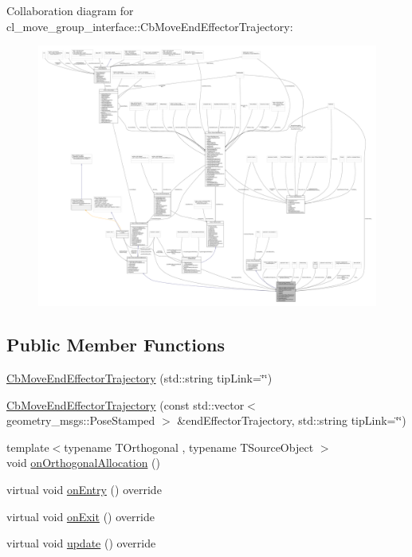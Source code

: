 Collaboration diagram for cl\+\_\+move\+\_\+group\+\_\+interface\+:\+:Cb\+Move\+End\+Effector\+Trajectory\+:
\nopagebreak
\begin{figure}[H]
\begin{center}
\leavevmode
\includegraphics[width=350pt]{classcl__move__group__interface_1_1CbMoveEndEffectorTrajectory__coll__graph}
\end{center}
\end{figure}
\subsection*{Public Member Functions}
\begin{DoxyCompactItemize}
\item 
\hyperlink{classcl__move__group__interface_1_1CbMoveEndEffectorTrajectory_af7e718b0c53e912fd74968abbb0a4810}{Cb\+Move\+End\+Effector\+Trajectory} (std\+::string tip\+Link=\char`\"{}\char`\"{})
\item 
\hyperlink{classcl__move__group__interface_1_1CbMoveEndEffectorTrajectory_ae6985de3f8f0e1ec7dea88c1e551889a}{Cb\+Move\+End\+Effector\+Trajectory} (const std\+::vector$<$ geometry\+\_\+msgs\+::\+Pose\+Stamped $>$ \&end\+Effector\+Trajectory, std\+::string tip\+Link=\char`\"{}\char`\"{})
\item 
{\footnotesize template$<$typename T\+Orthogonal , typename T\+Source\+Object $>$ }\\void \hyperlink{classcl__move__group__interface_1_1CbMoveEndEffectorTrajectory_aae4797fba54cb3bf371cc67d26a82186}{on\+Orthogonal\+Allocation} ()
\item 
virtual void \hyperlink{classcl__move__group__interface_1_1CbMoveEndEffectorTrajectory_aaedd074fd178c6390a4a3f1ccff23ad3}{on\+Entry} () override
\item 
virtual void \hyperlink{classcl__move__group__interface_1_1CbMoveEndEffectorTrajectory_a4952c092e69bc6e9831568de32888da5}{on\+Exit} () override
\item 
virtual void \hyperlink{classcl__move__group__interface_1_1CbMoveEndEffectorTrajectory_a57fedb6a0603fe569842a13faf19f5cd}{update} () override
\end{DoxyCompactItemize}
